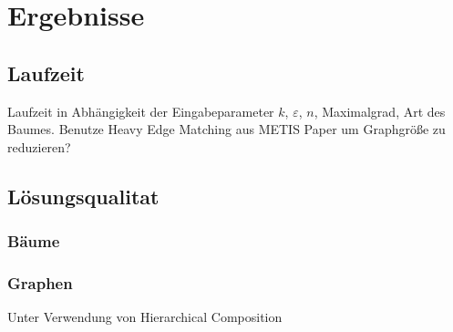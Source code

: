 
\chapter{Ergebnisse}\label{chapter:ergebnisse}
\section{Laufzeit}
    Laufzeit in Abhängigkeit der Eingabeparameter $k$, $\varepsilon$, $n$, Maximalgrad, Art des Baumes.
    Benutze Heavy Edge Matching aus METIS Paper um Graphgröße zu reduzieren?
\section{Lösungsqualitat}
\subsection{Bäume}
\subsection{Graphen}
Unter Verwendung von Hierarchical Composition

